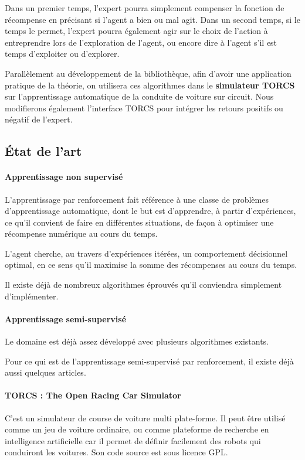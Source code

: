 \documentclass[a4paper,12pt]{article}
\begin{document}
	Dans un premier temps, l'expert pourra simplement compenser la fonction de récompense en précisant si 
	l'agent a bien ou mal agit. Dans un second temps, si le temps le permet, l'expert pourra également agir 
	sur le choix de l'action à entreprendre lors de l'exploration de l'agent, ou encore dire à l'agent s'il 
	est temps d'exploiter ou d'explorer.
	
	Parallèlement au développement de la bibliothèque, afin d'avoir une application pratique de la théorie,
	on utilisera ces algorithmes dans le \textbf{simulateur TORCS} sur l'apprentissage automatique de la conduite de 
	voiture sur circuit. Nous modifierons également l'interface TORCS pour intégrer les retours positifs ou 
	négatif de l'expert.

  \subsection{État de l'art}
    \paragraph{Apprentissage non supervisé} 
      L'apprentissage par renforcement fait référence à une classe de problèmes d'apprentissage automatique, 
      dont le but est d'apprendre, à partir d'expériences, ce qu'il convient de faire en différentes situations, 
      de façon à optimiser une récompense numérique au cours du temps.

      L'agent cherche, au travers d'expériences itérées, un comportement décisionnel optimal, en ce sens qu'il 
      maximise la somme des récompenses au cours du temps.
      \cite{Wiki_Reinforcement_learning} 
      
      Il existe déjà de nombreux algorithmes éprouvés qu'il conviendra simplement d'implémenter.
      \cite{ReinforceLearningIntro}
  
    \vfill
    \paragraph{Apprentissage semi-supervisé} 
      Le domaine est déjà assez développé avec plusieurs algorithmes existants.
      \cite{Wiki_SemiSupervised}
      
      Pour ce qui est de l'apprentissage semi-supervisé par renforcement, il existe déjà aussi quelques articles.
  
    \paragraph{TORCS : The Open Racing Car Simulator} C'est un simulateur de course de voiture multi plate-forme.
    Il peut être utilisé comme un jeu de voiture ordinaire, ou comme plateforme de recherche en intelligence artificielle 
    car il permet de définir facilement des robots qui conduiront les voitures. 
    Son code source est sous licence GPL.
    \cite{TORCS}
    
\end{document}
